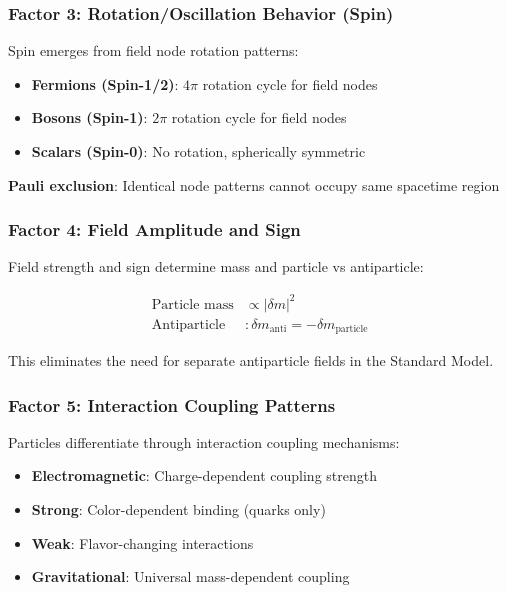\documentclass[12pt,a4paper]{article}
\newcommand{\deltafield}{\ensuremath{\delta m}}
\newcommand{\mypi}{\ensuremath{\pi}}
\newcommand{\mypropto}{\ensuremath{\propto}}
\begin{document}
	\subsubsection{Factor 3: Rotation/Oscillation Behavior (Spin)}
	\label{subsubsec:spin_behavior}
	
	Spin emerges from field node rotation patterns:
	
	\begin{tcolorbox}[colback=green!5!white,colframe=green!75!black,title=Spin from Field Node Rotation]
		\begin{itemize}
			\item \textbf{Fermions (Spin-1/2)}: $4\mypi$ rotation cycle for field nodes
			\item \textbf{Bosons (Spin-1)}: $2\mypi$ rotation cycle for field nodes
			\item \textbf{Scalars (Spin-0)}: No rotation, spherically symmetric
		\end{itemize}
		
		\textbf{Pauli exclusion}: Identical node patterns cannot occupy same spacetime region
	\end{tcolorbox}
	
	\subsubsection{Factor 4: Field Amplitude and Sign}
	\label{subsubsec:field_amplitude}
	
	Field strength and sign determine mass and particle vs antiparticle:
	
	\begin{align}
		\text{Particle mass} &\mypropto |\deltafield|^2 \\
		\text{Antiparticle} &: \deltafield_{\text{anti}} = -\deltafield_{\text{particle}}
	\end{align}
	
	This eliminates the need for separate antiparticle fields in the Standard Model.
	
	\subsubsection{Factor 5: Interaction Coupling Patterns}
	\label{subsubsec:coupling_patterns}
	
	Particles differentiate through interaction coupling mechanisms:
	\begin{itemize}
		\item \textbf{Electromagnetic}: Charge-dependent coupling strength
		\item \textbf{Strong}: Color-dependent binding (quarks only)
		\item \textbf{Weak}: Flavor-changing interactions
		\item \textbf{Gravitational}: Universal mass-dependent coupling
	\end{itemize}
	
\end{document}
